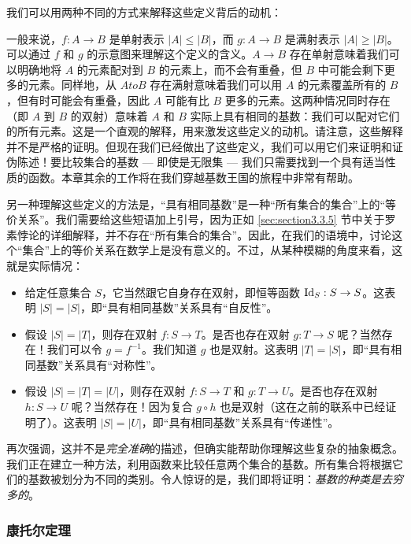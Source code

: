 我们可以用两种不同的方式来解释这些定义背后的动机：

一般来说，$f : A \to B$ 是单射表示 $|A| \le |B|$，而 $g : A \to B$ 是满射表示 $|A| \ge |B|$。可以通过 $f$ 和 $g$ 的示意图来理解这个定义的含义。$A \to B$ 存在单射意味着我们可以明确地将 $A$ 的元素配对到 $B$ 的元素上，而不会有重叠，但 $B$ 中可能会剩下更多的元素。同样地，从 $A to B$ 存在满射意味着我们可以用 $A$ 的元素覆盖所有的 $B$，但有时可能会有重叠，因此 $A$ 可能有比 $B$ 更多的元素。这两种情况同时存在（即 $A$ 到 $B$ 的双射）意味着 $A$ 和 $B$ 实际上具有相同的基数：我们可以配对它们的所有元素。这是一个直观的解释，用来激发这些定义的动机。请注意，这些解释并不是严格的证明。但现在我们已经做出了这些定义，我们可以用它们来证明和证伪陈述！要比较集合的基数 --- 即使是无限集 --- 我们只需要找到一个具有适当性质的函数。本章其余的工作将在我们穿越基数王国的旅程中非常有帮助。

另一种理解这些定义的方法是，``具有相同基数''是一种``所有集合的集合''上的``等价关系''。我们需要给这些短语加上引号，因为正如 \ref{sec:section3.3.5} 节中关于罗素悖论的详细解释，并不存在``所有集合的集合''。因此，在我们的语境中，讨论这个``集合''上的等价关系在数学上是没有意义的。不过，从某种模糊的角度来看，这就是实际情况：

\begin{itemize}
    \item 给定任意集合 $S$，它当然跟它自身存在双射，即恒等函数 $\text{Id}_S : S \to S$。这表明 $|S|=|S|$，即``具有相同基数''关系具有``自反性''。
    \item 假设 $|S| = |T|$，则存在双射 $f:S \to T$。是否也存在双射 $g : T \to S$ 呢？当然存在！我们可以令 $g=f^{-1}$。我们知道 $g$ 也是双射。这表明 $|T| = |S|$，即``具有相同基数''关系具有``对称性''。
    \item 假设 $|S| = |T| = |U|$，则存在双射 $f : S \to T$ 和 $g : T \to U$。是否也存在双射 $h : S \to U$ 呢？当然存在！因为复合 $g \circ h$ 也是双射（这在之前的联系中已经证明了）。这表明 $|S| = |U|$，即``具有相同基数''关系具有``传递性''。
\end{itemize}

再次强调，这并不是\emph{完全准确}的描述，但确实能帮助你理解这些复杂的抽象概念。我们正在建立一种方法，利用函数来比较任意两个集合的基数。所有集合将根据它们的基数被划分为不同的类别。令人惊讶的是，我们即将证明：\emph{基数的种类是去穷多的}。

\subsubsection*{康托尔定理}

